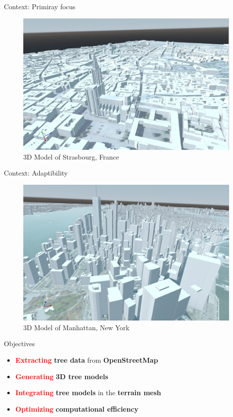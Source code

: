 \documentclass[10pt]{beamer}
\begin{document}
\begin{frame}{Context: Primiray focus}
	\begin{figure}
		\centering
		\includegraphics[width=\textwidth]{images/strasbourg-mesh-2.png}
		\caption{3D Model of Strasbourg, France}
		\label{fig:figure1}
	\end{figure}
\end{frame}

\begin{frame}{Context: Adaptibility}
	\begin{figure}
		\centering
		\includegraphics[width=\textwidth]{images/mesh-manhattan-2.png}
		\caption{3D Model of Manhattan, New York \cite{img:NY}}
		\label{fig:figure1}
	\end{figure}
\end{frame}

\begin{frame}{Objectives}
	\Large
	\begin{itemize}
		\item \textbf{\textcolor{red}{Extracting}} \textbf{tree data} from \textbf{OpenStreetMap}
		\item \textbf{\textcolor{red}{Generating}} \textbf{3D tree models}
		\item \textbf{\textcolor{red}{Integrating}} \textbf{tree models} in the \textbf{terrain mesh}
		\item \textbf{\textcolor{red}{Optimizing}} \textbf{computational efficiency}
	\end{itemize}
\end{frame}
\end{document}
